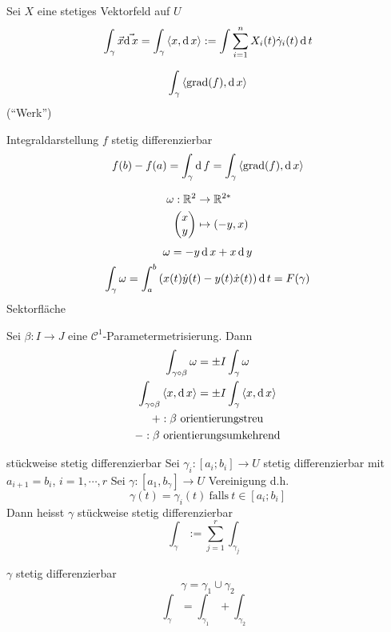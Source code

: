 \begin{Def}
  Sei $X$ eine stetiges Vektorfeld auf $U$
  \[\int_\gamma \vec x\vec{\operatorname{d} x}=\int_\gamma\left\langle x,\operatorname{d} x \right\rangle :=\int\sum_{i=1}^nX_i(t)\dot\gamma_i(t)\operatorname{d} t\]
\end{Def}
\begin{Bsp}
  \[\int_\gamma\left\langle \operatorname{grad}(f),\operatorname{d} x \right\rangle \]
  (``Werk'')
\end{Bsp}
\begin{Bem}{Integraldarstellung}
  $f$ stetig differenzierbar
  \[f(b)-f(a)=\int_\gamma\operatorname{d} f=\int_\gamma\left\langle \operatorname{grad}(f),\operatorname{d} x \right\rangle\]
\end{Bem}
\begin{Bsp}
  \begin{align*}
    \omega:\mathbb{R}^2&\to\mathbb{R}^{2*}\\
    \begin{pmatrix}x\\y\end{pmatrix}&\mapsto\left( -y,x \right)
  \end{align*}
  \begin{gather*}
    \omega=-y\operatorname{d} x+x\operatorname{d} y\\
    \int_\gamma\omega=\int_a^b\left( x(t)\dot y(t)-y(t)\dot x(t) \right)\operatorname{d} t= F(\gamma)
  \end{gather*}
  Sektorfläche
\end{Bsp}
\begin{Lem}
  Sei $\beta:I\to J$ eine $\mathcal{C}^1$-Parametermetrisierung. Dann
  \begin{gather*}
    \int_{\gamma\circ\beta}\omega = \pm I\int_\gamma\omega\\
    \int_{\gamma\circ\beta}\left\langle x,\operatorname{d} x \right\rangle = \pm I\int_\gamma\left\langle x,\operatorname{d} x \right\rangle \\
    +:\beta\ \text{orientierungstreu}\\
    -:\beta\ \text{orientierungsumkehrend}
  \end{gather*}
\end{Lem}
\begin{Def}{stückweise stetig differenzierbar}
  Sei $\gamma_i:[a_i;b_i]\to U$ stetig differenzierbar mit $a_{i+1}=b_i$, $i=1,\cdots,r$ Sei $\gamma:[a_1,b_\gamma]\to U$ Vereinigung d.h.
  \[\gamma(t)=\gamma_i(t)\ \text{falls}\ t\in\left[ a_i;b_i \right]\]
  Dann heisst $\gamma$ stückweise stetig differenzierbar
  \[\int_\gamma:=\sum_{j=1}^r \int_{\gamma_j}\]
\end{Def}
\begin{Bem}
  $\gamma$ stetig differenzierbar
  \[\gamma=\gamma_1\cup \gamma_2\]
  \[\int_\gamma=\int_{\gamma_1}+\int_{\gamma_2}\]
\end{Bem}
